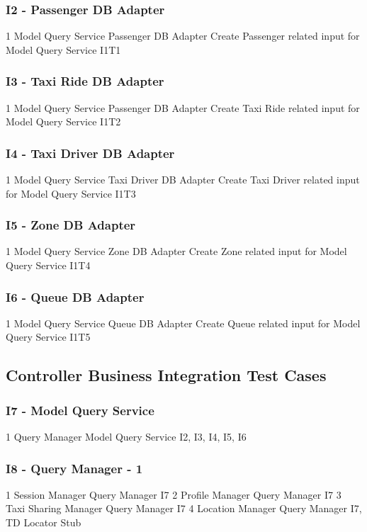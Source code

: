 \subsubsection{I2 - Passenger DB Adapter}
\testCaseSimple
	{1}
	{Model Query Service}
	{Passenger DB Adapter}
	{Create Passenger related input for Model Query Service}
	{I1T1}
\subsubsection{I3 - Taxi Ride DB Adapter}
\testCaseSimple
	{1}
	{Model Query Service}
	{Passenger DB Adapter}
	{Create Taxi Ride related input for Model Query Service}
	{I1T2}
\subsubsection{I4 - Taxi Driver DB Adapter}
\testCaseSimple
	{1}
	{Model Query Service}
	{Taxi Driver DB Adapter}
	{Create Taxi Driver related input for Model Query Service}
	{I1T3}
\subsubsection{I5 - Zone DB Adapter}
\testCaseSimple
	{1}
	{Model Query Service}
	{Zone DB Adapter}
	{Create Zone related input for Model Query Service}
	{I1T4}
\subsubsection{I6 - Queue DB Adapter}
\testCaseSimple
	{1}
	{Model Query Service}
	{Queue DB Adapter}
	{Create Queue related input for Model Query Service}
	{I1T5}
\subsection{Controller Business Integration Test Cases}
\subsubsection{I7 - Model Query Service}
\testCaseSimpleSimple
	{1}
	{Query Manager}
	{Model Query Service}
	{I2, I3, I4, I5, I6}
\subsubsection{I8 - Query Manager - 1}
\testCaseSimpleSimple
	{1}
	{Session Manager}
	{Query Manager}
	{I7}
\testCaseSimpleSimple
	{2}
	{Profile Manager}
	{Query Manager}
	{I7}
\testCaseSimpleSimple
	{3}
	{Taxi Sharing Manager}
	{Query Manager}
	{I7}
\testCaseSimpleSimple
	{4}
	{Location Manager}
	{Query Manager}
	{I7, TD Locator Stub}
